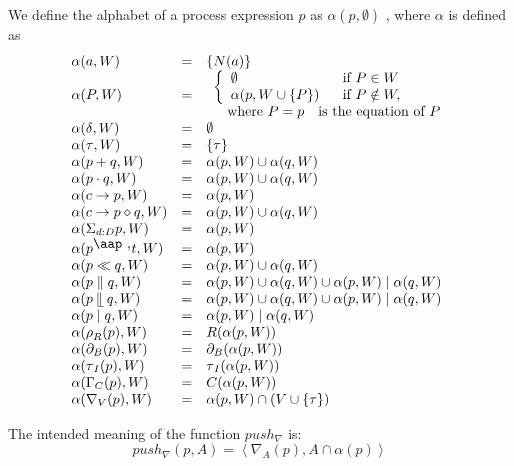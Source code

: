 \documentclass{article}
\begin{document}
We define the alphabet of a process expression $p$ as $\alpha (p,\emptyset )$%
, where $\alpha $ is defined as%
\[
\begin{array}{lll}
\alpha (a,W) & = & \{N(a)\} \\ 
\alpha (P,W) & = & 
\begin{array}{l}
\left\{ 
\begin{array}{ll}
\emptyset  & \text{if }P\in W \\ 
\alpha (p,W\cup \{P\}) & \text{if }P\notin W,%
\end{array}%
\right.  \\ 
\text{ where }P=p\text{ is the equation of }P%
\end{array}
\\ 
\alpha (\delta ,W) & = & \emptyset  \\ 
\alpha (\tau ,W) & = & \{\tau \} \\ 
\alpha (p+q,W) & = & \alpha (p,W)\cup \alpha (q,W) \\ 
\alpha (p\cdot q,W) & = & \alpha (p,W)\cup \alpha (q,W) \\ 
\alpha (c\rightarrow p,W) & = & \alpha (p,W) \\ 
\alpha (c\rightarrow p\diamond q,W) & = & \alpha (p,W)\cup \alpha (q,W) \\ 
\alpha (\Sigma _{d:D}p,W) & = & \alpha (p,W) \\ 
\alpha (p^{\mathbin{\mbox{\aap
,}}}t,W) & = & \alpha (p,W) \\ 
\alpha (p\ll q,W) & = & \alpha (p,W)\cup \alpha (q,W) \\ 
\alpha (p\parallel q,W) & = & \alpha (p,W)\cup \alpha (q,W)\cup \alpha
(p,W)\mid \alpha (q,W) \\ 
\alpha (p\mathbin{\mathrel{\llfloor}}q,W) & = & \alpha (p,W)\cup \alpha
(q,W)\cup \alpha (p,W)\mid \alpha (q,W) \\ 
\alpha (p\mid q,W) & = & \alpha (p,W)\mid \alpha (q,W) \\ 
\alpha (\rho _{R}(p),W) & = & R(\alpha (p,W)) \\ 
\alpha (\partial _{B}(p),W) & = & \partial _{B}(\alpha (p,W)) \\ 
\alpha (\tau _{I}(p),W) & = & \tau _{I}(\alpha (p,W)) \\ 
\alpha (\Gamma _{C}(p),W) & = & C(\alpha (p,W)) \\ 
\alpha (\nabla _{V}(p),W) & = & \alpha (p,W)\cap (V\cup \{\tau \})%
\end{array}%
\]

The intended meaning of the function $push_{\nabla }$ is:%
\[
push_{\nabla }(p,A)=\left\langle \nabla _{A}(p),A\cap \alpha
(p)\right\rangle 
\]
\end{document}
